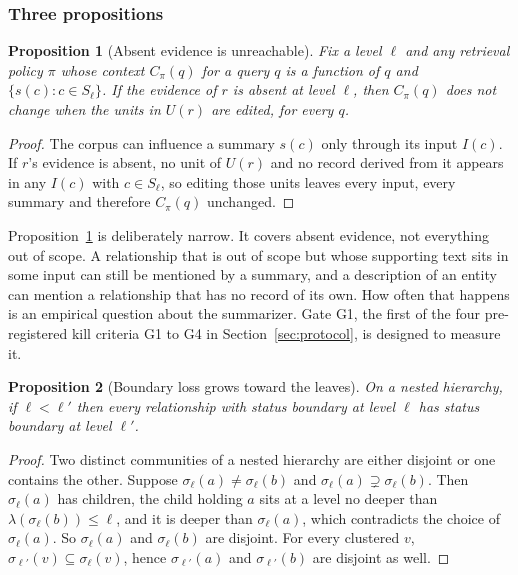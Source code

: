 \documentclass{ieeeaccess}
\newtheorem{proposition}{Proposition}
\theoremstyle{remark}
\newcommand{\Sel}{\sigma_\ell}
\newcommand{\In}{I}
\begin{document}
\subsubsection{Three propositions}

\begin{proposition}[Absent evidence is unreachable]\label{prop:unreach}
Fix a level $\ell$ and any retrieval policy $\pi$ whose context $C_\pi(q)$ for a query $q$ is a function of $q$ and $\{s(c):c\in S_\ell\}$. If the evidence of $r$ is absent at level $\ell$, then $C_\pi(q)$ does not change when the units in $U(r)$ are edited, for every $q$.
\end{proposition}
\begin{proof}
The corpus can influence a summary $s(c)$ only through its input $\In(c)$. If $r$'s evidence is absent, no unit of $U(r)$ and no record derived from it appears in any $\In(c)$ with $c\in S_\ell$, so editing those units leaves every input, every summary and therefore $C_\pi(q)$ unchanged.
\end{proof}

Proposition~\ref{prop:unreach} is deliberately narrow. It covers absent evidence, not everything out of scope. A relationship that is out of scope but whose supporting text sits in some input can still be mentioned by a summary, and a description of an entity can mention a relationship that has no record of its own. How often that happens is an empirical question about the summarizer. Gate G1, the first of the four pre-registered kill criteria G1 to G4 in Section~\ref{sec:protocol}, is designed to measure it.

\begin{proposition}[Boundary loss grows toward the leaves]\label{prop:mono}
On a nested hierarchy, if $\ell<\ell'$ then every relationship with status boundary at level $\ell$ has status boundary at level $\ell'$.
\end{proposition}
\begin{proof}
Two distinct communities of a nested hierarchy are either disjoint or one contains the other. Suppose $\Sel(a)\ne\Sel(b)$ and $\Sel(a)\supsetneq\Sel(b)$. Then $\Sel(a)$ has children, the child holding $a$ sits at a level no deeper than $\lambda(\Sel(b))\le\ell$, and it is deeper than $\Sel(a)$, which contradicts the choice of $\Sel(a)$. So $\Sel(a)$ and $\Sel(b)$ are disjoint. For every clustered $v$, $\sigma_{\ell'}(v)\subseteq\Sel(v)$, hence $\sigma_{\ell'}(a)$ and $\sigma_{\ell'}(b)$ are disjoint as well.
\end{proof}
\end{document}

